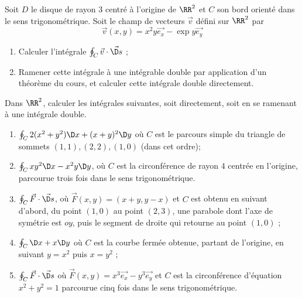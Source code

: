 \documentclass[12pt,french,oneside,a4paper]{memoir} %
\begin{document}
\begin{exo}
Soit $D$ le disque de rayon $3$ centré à l'origine de $\RR^{2}$ et $C$ son bord orienté dans le sens trigonométrique. Soit le champ de vecteurs $\vec v$ défini sur $\RR^{2}$ par
\begin{equation*}
  \vec v(x,y) = x^{2} y \vec{e_{x}} - \exp{y} \vec{e_{y}}  
\end{equation*}
\begin{enumerate}
\item Calculer l'intégrale $\oint_{C} \vec v \cdot \vec{\D s}$ ;
\item Ramener cette intégrale à une intégrable double par application d'un théorème du cours, et calculer cette intégrale double directement.
\end{enumerate}
\end{exo}
\begin{exo}
Dans $\RR^2$, calculer les intégrales suivantes, soit directement, soit en se ramenant à une intégrale double.
\begin{enumerate}
\item $\oint_{C} 2(x^{2}+y^{2}) \D x + (x+y)^{2} \D y$ où $C$ est le parcours simple du triangle de sommets $(1,1), (2,2), (1,0)$ (dans cet ordre);
\item $\oint_{C} xy^{2} \D x - x^{2}y\D y$, où $C$ est la circonférence de rayon $4$ centrée en l'origine, parcourue trois fois dans le sens trigonométrique.
\item $\oint_{C} \vec F \cdot \vec{\D s}$, où $\vec F(x,y) = (x+y,y-x)$ et $C$ est obtenu en suivant d'abord, du point $(1,0)$ au point $(2,3)$, une parabole dont l'axe de symétrie est $oy$, puis le segment de droite qui retourne au point $(1,0)$ ;
\item $\oint_{C} \D x + x \D y$ où $C$ est la courbe fermée obtenue, partant de l'origine, en suivant $y = x^{2}$ puis $x = y^{2}$ ;
\item $\oint_{C} \vec F \cdot \vec {\D s}$ où $\vec F(x,y) = x^{3} \vec{e_{x}} - y^{3} \vec{e_{y}}$ et $C$ est la circonférence d'équation $x^{2}+y^{2} = 1$ parcourue cinq fois dans le sens trigonométrique.
\end{enumerate}
\end{exo}
\end{document}
